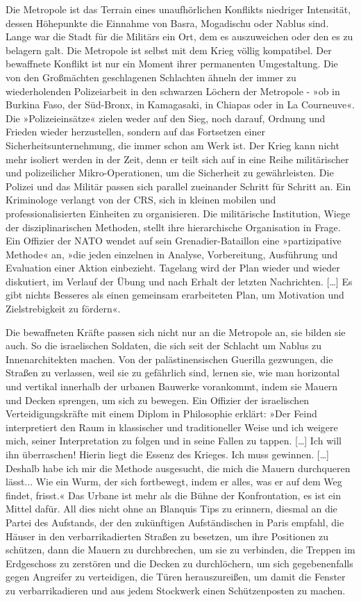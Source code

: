 Die Metropole ist das Terrain eines unaufhörlichen Konflikts
niedriger Intensität, dessen Höhepunkte die Einnahme von Basra,
Mogadischu oder Nablus sind. Lange war die Stadt für die Militärs
ein Ort, dem es auszuweichen oder den es zu belagern galt. Die
Metropole ist selbst mit dem Krieg völlig kompatibel. Der
bewaffnete Konflikt ist nur ein Moment ihrer permanenten
Umgestaltung. Die von den Großmächten geschlagenen Schlachten
ähneln der immer zu wiederholenden Polizeiarbeit in den schwarzen
Löchern der Metropole - »ob in Burkina Faso, der Süd-Bronx, in
Kamagasaki, in Chiapas oder in La Courneuve«. Die »Polizeieinsätze«
zielen weder auf den Sieg, noch darauf, Ordnung und Frieden wieder
herzustellen, sondern auf das Fortsetzen einer
Sicherheitsunternehmung, die immer schon am Werk ist. Der Krieg
kann nicht mehr isoliert werden in der Zeit, denn er teilt sich auf
in eine Reihe militärischer und polizeilicher Mikro-Operationen, um
die Sicherheit zu gewährleisten.
Die Polizei und das Militär passen sich parallel zueinander Schritt
für Schritt an. Ein Kriminologe verlangt von der CRS, sich in
kleinen mobilen und professionalisierten Einheiten zu organisieren.
Die militärische Institution, Wiege der disziplinarischen Methoden,
stellt ihre hierarchische Organisation in Frage. Ein Offizier der
NATO wendet auf sein Grenadier-Bataillon eine »partizipative
Methode« an, »die jeden einzelnen in Analyse, Vorbereitung,
Ausführung und Evaluation einer Aktion einbezieht. Tagelang wird
der Plan wieder und wieder diskutiert, im Verlauf der Übung und
nach Erhalt der letzten Nachrichten. […] Es gibt nichts Besseres
als einen gemeinsam erarbeiteten Plan, um Motivation und
Zielstrebigkeit zu fördern«.

Die bewaffneten Kräfte passen sich nicht nur an die Metropole an,
sie bilden sie auch. So die israelischen Soldaten, die sich seit
der Schlacht um Nablus zu Innenarchitekten machen. Von der
palästinensischen Guerilla gezwungen, die Straßen zu verlassen,
weil sie zu gefährlich sind, lernen sie, wie man horizontal und
vertikal innerhalb der urbanen Bauwerke vorankommt, indem sie
Mauern und Decken sprengen, um sich zu bewegen. Ein Offizier der
israelischen Verteidigungskräfte mit einem Diplom in Philosophie
erklärt: »Der Feind interpretiert den Raum in klassischer und
traditioneller Weise und ich weigere mich, seiner Interpretation zu
folgen und in seine Fallen zu tappen. […] Ich will ihn überraschen!
Hierin liegt die Essenz des Krieges. Ich muss gewinnen. […] Deshalb
habe ich mir die Methode ausgesucht, die mich die Mauern
durchqueren lässt... Wie ein Wurm, der sich fortbewegt, indem er
alles, was er auf dem Weg findet, frisst.« Das Urbane ist mehr als
die Bühne der Konfrontation, es ist ein Mittel dafür. All dies
nicht ohne an Blanquis Tips zu erinnern, diesmal an die Partei des
Aufstands, der den zukünftigen Aufständischen in Paris empfahl, die
Häuser in den verbarrikadierten Straßen zu besetzen, um ihre
Positionen zu schützen, dann die Mauern zu durchbrechen, um sie zu
verbinden, die Treppen im Erdgeschoss zu zerstören und die Decken
zu durchlöchern, um sich gegebenenfalls gegen Angreifer zu
verteidigen, die Türen herauszureißen, um damit die Fenster zu
verbarrikadieren und aus jedem Stockwerk einen Schützenposten zu
machen.

